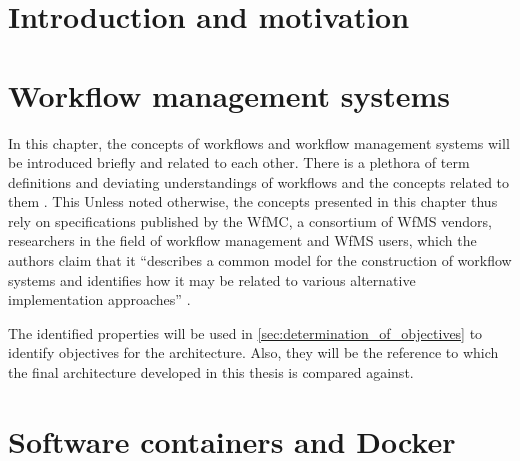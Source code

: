 \documentclass[language=english,noinputenc]{wiwwuwordrprt}
\begin{document}
  \newlength{\customtabwidth}
  \setlength{\customtabwidth}{\textwidth}
  \addtolength{\customtabwidth}{-\tabcolsep}
  \captionsetup{justification=centering}


  \EinfTitelseite

  \tableofcontents
  \listoffigures
  \listoftables
  \listoflistings

  

  \clearpage
  


  \chapter{Introduction and motivation} %
    \label{cha:introduction_and_motivation}
    

  \chapter{Workflow management systems} %
    \label{cha:workflow_management_systems}
    In this chapter, the concepts of workflows and workflow management systems will be introduced briefly and related to each other.
    There is a plethora of term definitions and deviating understandings of workflows and the concepts related to them \cite{Casati1999Specification}. This
    Unless noted otherwise, the concepts presented in this chapter thus rely on specifications published by the \ac{WfMC}, a consortium of \ac{WfMS} vendors, researchers in the field of workflow management and \ac{WfMS} users, which the authors claim that it ``describes a common model for the construction of workflow systems and identifies how it may be related to various alternative implementation approaches'' \cite{Hollingsworth1995Wfmc}.

    The identified properties will be used in \ref{sec:determination_of_objectives} to identify objectives for the architecture. Also, they will be the reference to which the final architecture developed in this thesis is compared against.
    

  \chapter{Software containers and Docker} %
    \label{cha:docker}
\end{document}
